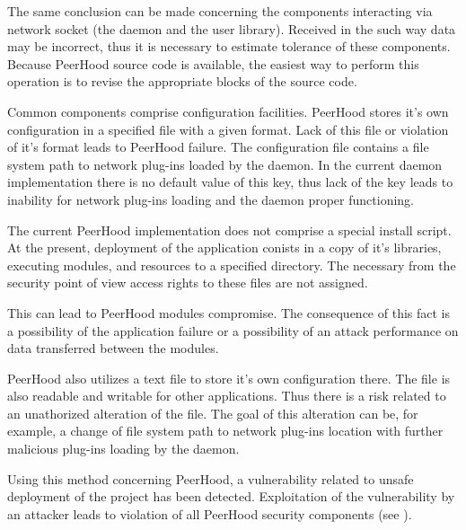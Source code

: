 %
The same conclusion can be made concerning the components interacting via network socket (the daemon and the user library). 
%
Received in the such way data may be incorrect, thus it is necessary to estimate tolerance of these components. 
%
Because PeerHood source code is available, the easiest way to perform this operation is to revise the appropriate blocks of the source code. 

%
Common components comprise configuration facilities. 
%
PeerHood stores it's own configuration in a specified file with a given format. 
%
Lack of this file or violation of it's format leads to PeerHood failure. 
%
The configuration file contains a file system path to network plug-ins loaded by the daemon. 
%
In the current daemon implementation there is no default value of this key, thus lack of the key leads to inability for network plug-ins loading and the daemon proper functioning. 

%
The current PeerHood implementation does not comprise a special install script. 
%
At the present, deployment of the application conists in a copy of it's libraries, executing modules, and resources to a specified directory. 
%
The necessary from the security point of view access rights to these files are not assigned. 

%
This can lead to PeerHood modules compromise. 
%
The consequence of this fact is a possibility of the application failure or a possibility of an attack performance on data transferred between the modules. 

%
PeerHood also utilizes a text file to store it's own configuration there. 
%
The file is also readable and writable for other applications. 
%
Thus there is a risk related to an unathorized alteration of the file. 
%
The goal of this alteration can be, for example, a change of file system path to network plug-ins location with further malicious plug-ins loading by the daemon. 

%
Using this method concerning PeerHood, a vulnerability related to unsafe deployment of the project has been detected. 
%
Exploitation of the vulnerability by an attacker leads to violation of all PeerHood security components (see ). 

